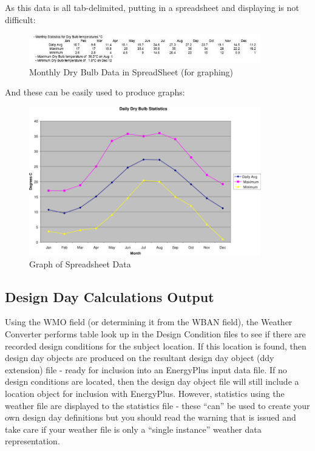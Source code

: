 As this data is all tab-delimited, putting in a spreadsheet and displaying is not difficult:

\begin{figure}[hbtp] %
\centering
\includegraphics[width=0.9\textwidth, height=0.9\textheight, keepaspectratio=true]{media/image008.jpg}
\caption{Monthly Dry Bulb Data in SpreadSheet (for graphing) \protect \label{fig:monthly-dry-bulb-data-in-spreadsheet-for}}
\end{figure}

And these can be easily used to produce graphs:

\begin{figure}[hbtp] %
\centering
\includegraphics[width=0.9\textwidth, height=0.9\textheight, keepaspectratio=true]{media/image009.png}
\caption{Graph of Spreadsheet Data \protect \label{fig:graph-of-spreadsheet-data}}
\end{figure}

\subsection{Design Day Calculations Output}\label{design-day-calculations-output}

Using the WMO field (or determining it from the WBAN field), the Weather Converter performs table look up in the Design Condition files to see if there are recorded design conditions for the subject location. If this location is found, then design day objects are produced on the resultant design day object (ddy extension) file - ready for inclusion into an EnergyPlus input data file. If no design conditions are located, then the design day object file will still include a location object for inclusion with EnergyPlus. However, statistics using the weather file are displayed to the statistics file - these ``can'' be used to create your own design day definitions but you should read the warning that is issued and take care if your weather file is only a ``single instance'' weather data representation.

